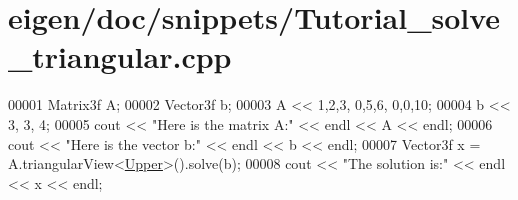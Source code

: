 \hypertarget{eigen_2doc_2snippets_2_tutorial__solve__triangular_8cpp_source}{}\section{eigen/doc/snippets/\+Tutorial\+\_\+solve\+\_\+triangular.cpp}
\label{eigen_2doc_2snippets_2_tutorial__solve__triangular_8cpp_source}

\begin{DoxyCode}
00001 Matrix3f A;
00002 Vector3f b;
00003 A << 1,2,3,  0,5,6,  0,0,10;
00004 b << 3, 3, 4;
00005 cout << \textcolor{stringliteral}{"Here is the matrix A:"} << endl << A << endl;
00006 cout << \textcolor{stringliteral}{"Here is the vector b:"} << endl << b << endl;
00007 Vector3f x = A.triangularView<\hyperlink{group__enums_gga39e3366ff5554d731e7dc8bb642f83cda6bcb58be3b8b8ec84859ce0c5ac0aaec}{Upper}>().solve(b);
00008 cout << \textcolor{stringliteral}{"The solution is:"} << endl << x << endl;
\end{DoxyCode}
